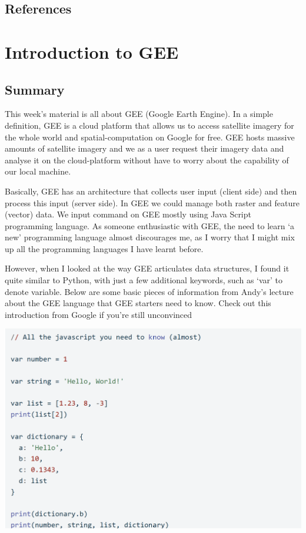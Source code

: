 \documentclass[
  letterpaper,
  DIV=11,
  numbers=noendperiod]{scrreprt}
\begin{document}
\hypertarget{references-2}{%
\section{References}\label{references-2}}


\hypertarget{introduction-to-gee}{%
\chapter{Introduction to GEE}\label{introduction-to-gee}}

\hypertarget{summary-4}{%
\section{Summary}\label{summary-4}}

This week's material is all about GEE (Google Earth Engine). In a simple
definition, GEE is a cloud platform that allows us to access satellite
imagery for the whole world and spatial-computation on Google for free.
GEE hosts massive amounts of satellite imagery and we as a user request
their imagery data and analyse it on the cloud-platform without have to
worry about the capability of our local machine.

Basically, GEE has an architecture that collects user input (client
side) and then process this input (server side). In GEE we could manage
both raster and feature (vector) data. We input command on GEE mostly
using Java Script programming language. As someone enthusiastic with
GEE, the need to learn `a new' programming language almost discourages
me, as I worry that I might mix up all the programming languages I have
learnt before.

However, when I looked at the way GEE articulates data structures, I
found it quite similar to Python, with just a few additional keywords,
such as `var' to denote variable. Below are some basic pieces of
information from Andy's lecture about the GEE language that GEE starters
need to know. Check out this introduction from Google if you're still
unconvinced

\includegraphics[width=5.29167in,height=\textheight]{images/clipboard-203956171.png}
\end{document}
